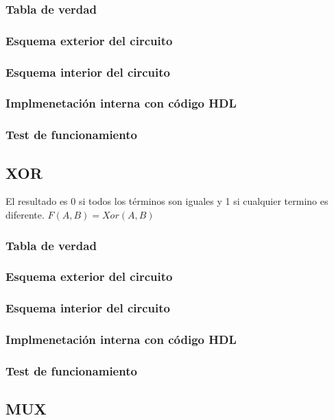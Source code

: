 \documentclass[12pt]{article}
\begin{document}
        \subsubsection{Tabla de verdad}
        \subsubsection{Esquema exterior del circuito}
        \subsubsection{Esquema interior del circuito}
        \subsubsection{Implmenetación interna con código HDL}
        \subsubsection{Test de funcionamiento}
    \newpage
    \subsection{XOR}
        El resultado es 0 si todos los términos son iguales y 1 si cualquier termino es diferente.
        $F(A,B) = Xor(A,B)$
        \subsubsection{Tabla de verdad}
        \subsubsection{Esquema exterior del circuito}
        \subsubsection{Esquema interior del circuito}
        \subsubsection{Implmenetación interna con código HDL}
        \subsubsection{Test de funcionamiento}
    \newpage
    \subsection{MUX}
\end{document}
